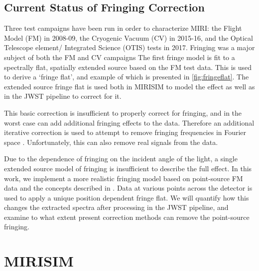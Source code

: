 \subsection{Current Status of Fringing Correction}
Three test campaigns have been run in order to characterize MIRI: the Flight Model (FM) in 2008-09, the Cryogenic Vacuum (CV) in 2015-16, and the Optical Telescope element/ Integrated Science (OTIS) tests in 2017. 
Fringing was a major subject of both the FM and CV campaigns
The first fringe model is fit to a spectrally flat, spatially extended source based on the FM test data.
This is used to derive a `fringe flat', and example of which is presented in \ref{fig:fringeflat}.
The extended source fringe flat is used both in MIRISIM to model the effect as well as in the JWST pipeline to correct for it.

This basic correction is insufficient to properly correct for fringing, and in the worst case can add additional fringing effects to the data. 
Therefore an additional iterative correction is used to attempt to remove fringing frequencies in Fourier space \parencite{Lahuis2003,Lahuis2018}.
Unfortunately, this can also remove real signals from the data.

Due to the dependence of fringing on the incident angle of the light, a single extended source model of fringing is insufficient to describe the full effect. 
In this work, we implement a more realistic fringing model based on point-source FM data and the concepts described in \parencite{Argyriou2018a}. 
Data at various points across the detector is used to apply a unique position dependent fringe flat.
We  will quantify how this changes the extracted spectra after processing in the JWST pipeline, and examine to what extent present correction methods can remove the point-source fringing.


\section{MIRISIM}

